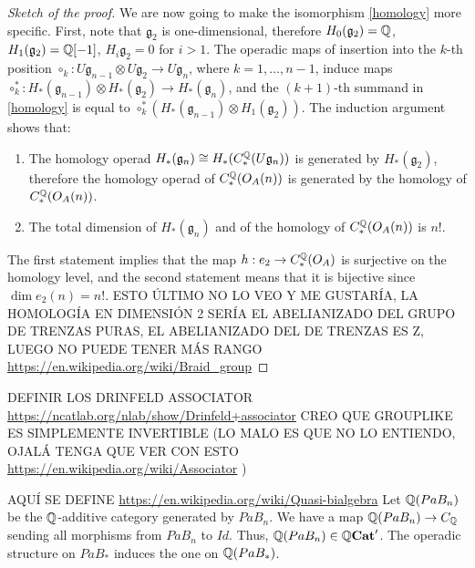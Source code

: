 \documentclass[TFM.tex]{subfiles}
\begin{document}
\begin{proof}[Sketch of the proof]
We are now going to make the isomorphism \ref{homology} more specific. First, note that $\mathfrak{g}_2$ is
one-dimensional, therefore $H_0(\mathfrak{g}_2)=\mathbb{Q}$, $H_1(\mathfrak{g}_2)=\mathbb{Q}[-1]$, $H_i\mathfrak{g}_2=0$ for $i > 1$. The operadic maps of insertion into the $k$-th position $\circ_k:U\mathfrak{g}_{n-1}\otimes U\mathfrak{g}_2\to U\mathfrak{g}_n$, where $k=1,\dots, n-1$, induce maps $\circ_k^*:H_*(\mathfrak{g}_{n-1})\otimes H_*(\mathfrak{g}_2)\to H_*(\mathfrak{g}_n)$, and the $(k+1)$-th summand in \ref{homology} is equal to $\circ_k^*(H_*(\mathfrak{g}_{n-1})\otimes H_1(\mathfrak{g}_2))$. The induction argument
shows that:
\begin{enumerate}
\item The homology operad $H_*(\mathfrak{g}_n)\cong H_*(C_*^{\mathbb{Q}}(U\mathfrak{g}_n))$ is generated by $H_*(\mathfrak{g}_2)$, therefore the homology operad of $C_*^{\mathbb{Q}}(O_A(n))$ is generated by the homology of $C_*^{\mathbb{Q}}(O_A(n))$.
\item The total dimension of $H_*(\mathfrak{g}_n)$ and of the homology of $C_*^{\mathbb{Q}}(O_A(n))$ is $n!$.  
\end{enumerate}

The first statement implies that the map $h:e_2\to C_*^{\mathbb{Q}}(O_A)$ is surjective on the homology level, and
the second statement means that it is bijective since $\dim e_2(n)= n!$. ESTO ÚLTIMO NO LO VEO Y ME GUSTARÍA, LA HOMOLOGÍA EN DIMENSIÓN 2 SERÍA EL ABELIANIZADO DEL GRUPO DE TRENZAS PURAS, EL ABELIANIZADO DEL DE TRENZAS ES Z, LUEGO NO PUEDE TENER MÁS RANGO \url{https://en.wikipedia.org/wiki/Braid_group}

\end{proof}
DEFINIR LOS DRINFELD ASSOCIATOR \url{https://ncatlab.org/nlab/show/Drinfeld+associator} CREO QUE GROUPLIKE ES SIMPLEMENTE INVERTIBLE (LO MALO ES QUE NO LO ENTIENDO, OJALÁ TENGA QUE VER CON ESTO \url{https://en.wikipedia.org/wiki/Associator} ) 

AQUÍ SE DEFINE \url{https://en.wikipedia.org/wiki/Quasi-bialgebra}
Let $\mathbb{Q}(PaB_n)$ be the $\mathbb{Q}$-additive category generated by $PaB_n$. We have a map
$\mathbb{Q}(PaB_n)\to C_{\mathbb{Q}}$ sending all morphisms from $PaB_n$ to $Id$. Thus, $\mathbb{Q}(PaB_n)\in \mathbb{Q}\mathrm{\mathbf{Cat}}'$.
The operadic structure on $PaB_*$ induces the one on $\mathbb{Q}(PaB_*)$.
\end{document}
